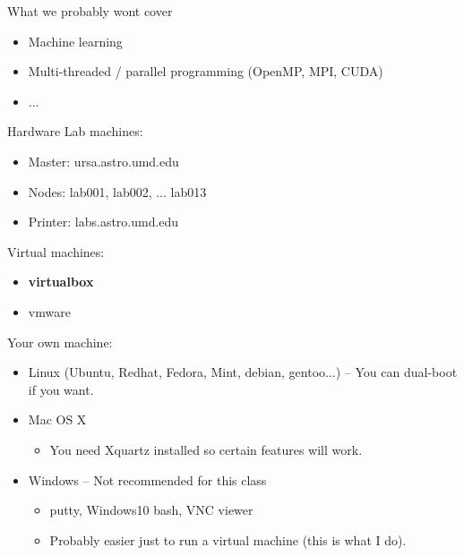 \documentclass[10pt]{beamer}
\begin{document}
\begin{frame}[fragile]{What we probably wont cover}

\begin{itemize}
	\item Machine learning
	\item Multi-threaded / parallel programming (OpenMP, MPI, CUDA)
	\item ...
\end{itemize}


\end{frame}

\begin{frame}[fragile]{Hardware}
Lab machines:
\begin{itemize}
	\item Master: ursa.astro.umd.edu
	\item Nodes: lab001, lab002, ... lab013
	\item Printer: labs.astro.umd.edu
\end{itemize}


Virtual machines:
\begin{itemize}
	\item \textbf{virtualbox}
	\item vmware
\end{itemize}

Your own machine:
\begin{itemize}
	\item Linux (Ubuntu, Redhat, Fedora, Mint, debian, gentoo...) -- You can dual-boot if you want. 
	\item Mac OS X
	\begin{itemize}
		\item You need Xquartz installed so certain features will work. 
	\end{itemize}
	\item Windows -- Not recommended for this class
	\begin{itemize}
		\item putty, Windows10 bash, VNC viewer
		\item Probably easier just to run a virtual machine (this is what I do). 
	\end{itemize}
\end{itemize}
\end{frame}
\end{document}

